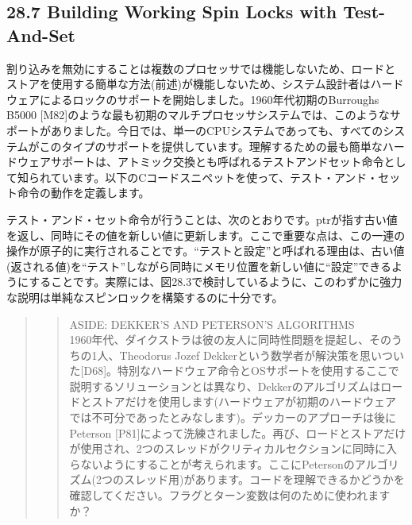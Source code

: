 \hypertarget{building-working-spin-locks-with-test-and-set}{%
\subsection*{28.7 Building Working Spin Locks with
Test-And-Set}\label{building-working-spin-locks-with-test-and-set}}

割り込みを無効にすることは複数のプロセッサでは機能しないため、ロードとストアを使用する簡単な方法(前述)が機能しないため、システム設計者はハードウェアによるロックのサポートを開始しました。1960年代初期のBurroughs
B5000
{[}M82{]}のような最も初期のマルチプロセッサシステムでは、このようなサポートがありました。今日では、単一のCPUシステムであっても、すべてのシステムがこのタイプのサポートを提供しています。理解するための最も簡単なハードウェアサポートは、アトミック交換とも呼ばれるテストアンドセット命令として知られています。以下のCコードスニペットを使って、テスト・アンド・セット命令の動作を定義します。

\begin{Shaded}
\begin{Highlighting}[]
 
 
 
\NormalTok{ \}}
\end{Highlighting}
\end{Shaded}

テスト・アンド・セット命令が行うことは、次のとおりです。ptrが指す古い値を返し、同時にその値を新しい値に更新します。ここで重要な点は、この一連の操作が原子的に実行されることです。``テストと設定''と呼ばれる理由は、古い値(返される値)を``テスト''しながら同時にメモリ位置を新しい値に``設定''できるようにすることです。実際には、図28.3で検討しているように、このわずかに強力な説明は単純なスピンロックを構築するのに十分です。

\begin{quote}
\begin{quote}
ASIDE: DEKKER'S AND PETERSON'S ALGORITHMS\\
1960年代、ダイクストラは彼の友人に同時性問題を提起し、そのうちの1人、Theodorus
Jozef
Dekkerという数学者が解決策を思いついた{[}D68{]}。特別なハードウェア命令とOSサポートを使用するここで説明するソリューションとは異なり、Dekkerのアルゴリズムはロードとストアだけを使用します(ハードウェアが初期のハードウェアでは不可分であったとみなします)。デッカーのアプローチは後にPeterson
{[}P81{]}によって洗練されました。再び、ロードとストアだけが使用され、2つのスレッドがクリティカルセクションに同時に入らないようにすることが考えられます。ここにPetersonのアルゴリズム(2つのスレッド用)があります。コードを理解できるかどうかを確認してください。フラグとターン変数は何のために使われますか？
\end{quote}
\end{quote}

